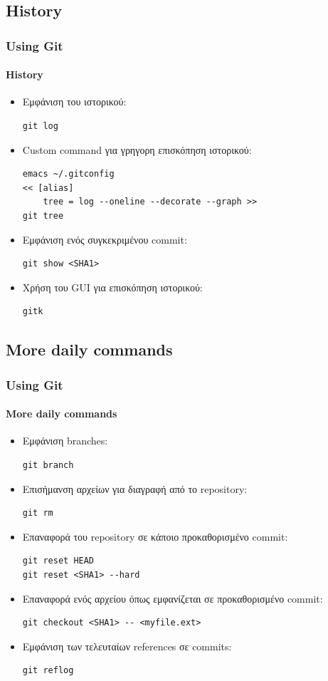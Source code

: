 \documentclass[]{beamer}
\begin{document}
\subsection{History}

\begin{frame}[fragile]
  \frametitle{Using Git}
  \framesubtitle{History}
  \begin{itemize}
    \item Εμφάνιση του ιστορικού:
\begin{verbatim}
git log
\end{verbatim}
    \item Custom command για γρηγορη επισκόπηση ιστορικού:
\begin{verbatim}
emacs ~/.gitconfig
<< [alias]	
	tree = log --oneline --decorate --graph >>
git tree
\end{verbatim}
    \item Εμφάνιση ενός συγκεκριμένου commit:
\begin{verbatim}
git show <SHA1>
\end{verbatim}
    \item Χρήση του GUI για επισκόπηση ιστορικού:
\begin{verbatim}
gitk
\end{verbatim}
  \end{itemize}
\end{frame}

\subsection{More daily commands}

\begin{frame}[fragile]
  \frametitle{Using Git}
  \framesubtitle{More daily commands}
  \begin{itemize}
    \item Εμφάνιση branches:
\begin{verbatim}
git branch
\end{verbatim}
    \item Επισήμανση αρχείων για διαγραφή από το repository:
\begin{verbatim}
git rm
\end{verbatim}
    \item Επαναφορά του repository σε κάποιο προκαθορισμένο commit:
\begin{verbatim}
git reset HEAD
git reset <SHA1> --hard
\end{verbatim}
    \item Επαναφορά ενός αρχείου όπως εμφανίζεται σε προκαθορισμένο commit:
\begin{verbatim}
git checkout <SHA1> -- <myfile.ext>
\end{verbatim}
    \item Εμφάνιση των τελευταίων references σε commits:
\begin{verbatim}
git reflog
\end{verbatim}
  \end{itemize}
\end{frame}
\end{document}
